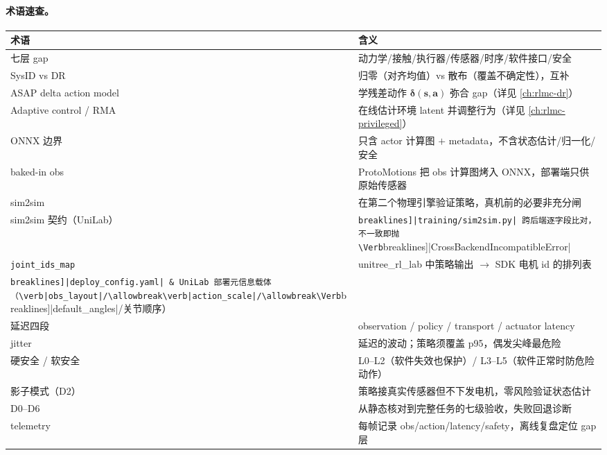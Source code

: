 \paragraph{术语速查。}
\begin{center}
\small
\begin{tabular}{@{}lp{8.6cm}@{}}
\toprule
术语 & 含义 \\
\midrule
七层 gap & 动力学/接触/执行器/传感器/时序/软件接口/安全 \\
SysID vs DR & 归零（对齐均值）vs 散布（覆盖不确定性），互补 \\
ASAP delta action model & 学残差动作 $\boldsymbol\delta(\mathbf s,\mathbf a)$ 弥合 gap（详见 \cref{ch:rlmc-dr}） \\
Adaptive control / RMA & 在线估计环境 latent 并调整行为（详见 \cref{ch:rlmc-privileged}） \\
ONNX 边界 & 只含 actor 计算图 $+$ metadata，不含状态估计/归一化/安全 \\
baked-in obs & ProtoMotions 把 obs 计算图烤入 ONNX，部署端只供原始传感器 \\
sim2sim & 在第二个物理引擎验证策略，真机前的必要非充分闸 \\
sim2sim 契约（UniLab） & \Verb[breaklines]|training/sim2sim.py| 跨后端逐字段比对，不一致即抛 \Verb[breaklines]|CrossBackendIncompatibleError| \\
\verb|joint_ids_map| & unitree\_rl\_lab 中策略输出 $\to$ SDK 电机 id 的排列表 \\
\Verb[breaklines]|deploy_config.yaml| & UniLab 部署元信息载体（\verb|obs_layout|/\allowbreak\verb|action_scale|/\allowbreak\Verb[breaklines]|default_angles|/关节顺序） \\
延迟四段 & observation / policy / transport / actuator latency \\
jitter & 延迟的波动；策略须覆盖 p95，偶发尖峰最危险 \\
硬安全 / 软安全 & L0--L2（软件失效也保护）/ L3--L5（软件正常时防危险动作） \\
影子模式（D2） & 策略接真实传感器但不下发电机，零风险验证状态估计 \\
D0--D6 & 从静态核对到完整任务的七级验收，失败回退诊断 \\
telemetry & 每帧记录 obs/action/latency/safety，离线复盘定位 gap 层 \\
\bottomrule
\end{tabular}
\end{center}

